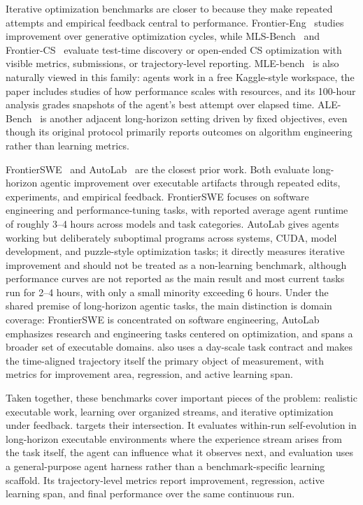 Iterative optimization benchmarks are closer to \benchmark{} because they make repeated attempts and empirical feedback central to performance. Frontier-Eng~\cite{chi2026frontiereng} studies improvement over generative optimization cycles, while MLS-Bench~\cite{lyu2026mlsbench} and Frontier-CS~\cite{mang2025frontiercs} evaluate test-time discovery or open-ended CS optimization with visible metrics, submissions, or trajectory-level reporting. MLE-bench~\cite{chan2024mlebench} is also naturally viewed in this family: agents work in a free Kaggle-style workspace, the paper includes studies of how performance scales with resources, and its 100-hour analysis grades snapshots of the agent's best attempt over elapsed time. ALE-Bench~\cite{imajuku2025alebench} is another adjacent long-horizon setting driven by fixed objectives, even though its original protocol primarily reports outcomes on algorithm engineering rather than learning metrics.

FrontierSWE~\cite{chu2026frontierswe} and AutoLab~\cite{xu2026autolab} are the closest prior work. Both evaluate long-horizon agentic improvement over executable artifacts through repeated edits, experiments, and empirical feedback. FrontierSWE focuses on software engineering and performance-tuning tasks, with reported average agent runtime of roughly 3--4 hours across models and task categories. AutoLab gives agents working but deliberately suboptimal programs across systems, CUDA, model development, and puzzle-style optimization tasks; it directly measures iterative improvement and should not be treated as a non-learning benchmark, although performance curves are not reported as the main result and most current tasks run for 2--4 hours, with only a small minority exceeding 6 hours. Under the shared premise of long-horizon agentic tasks, the main distinction is domain coverage: FrontierSWE is concentrated on software engineering, AutoLab emphasizes research and engineering tasks centered on optimization, and \benchmark{} spans a broader set of executable domains. \benchmark{} also uses a day-scale task contract and makes the time-aligned trajectory itself the primary object of measurement, with metrics for improvement area, regression, and active learning span.

Taken together, these benchmarks cover important pieces of the problem: realistic executable work, learning over organized streams, and iterative optimization under feedback. \benchmark{} targets their intersection. It evaluates within-run self-evolution in long-horizon executable environments where the experience stream arises from the task itself, the agent can influence what it observes next, and evaluation uses a general-purpose agent harness rather than a benchmark-specific learning scaffold. Its trajectory-level metrics report improvement, regression, active learning span, and final performance over the same continuous run.

